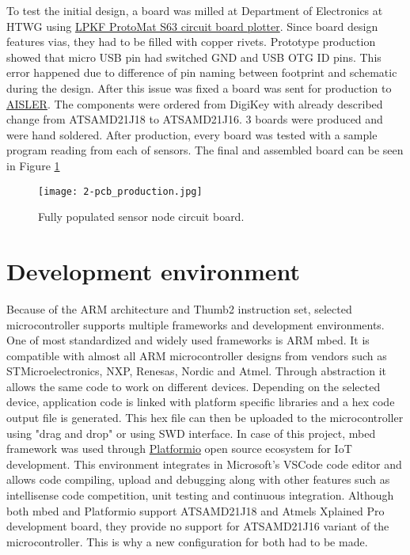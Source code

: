 To test the initial design, a board was milled at Department of Electronics at \ac{HTWG} using \href{http://www.lpkf.com/products/rapid-pcb-prototyping/circuit-board-plotter/protomat-s63.htm}{LPKF ProtoMat S63 circuit board plotter}. Since board design features vias, they had to be filled with copper rivets. Prototype production showed that micro USB pin had switched GND and USB OTG ID pins. This error happened due to difference of pin naming between footprint and schematic during the design. After this issue was fixed a board was sent for production to \href{https://aisler.net/}{AISLER}. The components were ordered from DigiKey with already described change from ATSAMD21J18 to ATSAMD21J16. 3 boards were produced and were hand soldered. After production, every board was tested with a sample program reading from each of sensors. The final and assembled board can be seen in Figure \ref{fig:pcb_production}

\begin{figure}[h]
  \begin{center}
    \texttt{[image: 2-pcb\_production.jpg]}
  \end{center}
  \caption{Fully populated sensor node circuit board.}
  \label{fig:pcb_production}
\end{figure}


\section{Development environment}

Because of the ARM architecture and Thumb2 instruction set, selected microcontroller supports multiple frameworks and development environments. One of most standardized and widely used frameworks is ARM mbed. It is compatible with almost all ARM microcontroller designs from vendors such as STMicroelectronics, NXP, Renesas, Nordic and Atmel\cite{mbed_devices}. Through abstraction it allows the same code to work on different devices. Depending on the selected device, application code is linked with platform specific libraries and a hex code output file is generated. This hex file can then be uploaded to the microcontroller using "drag and drop" or using \ac{SWD} interface\cite{SWD}. In case of this project, mbed framework was used through \href{http://platformio.org}{Platformio} open source ecosystem for \ac{IoT} development. This environment integrates in Microsoft's VSCode code editor and allows code compiling, upload and debugging along with other features such as intellisense code competition, unit testing and continuous integration. Although both mbed and Platformio support ATSAMD21J18 and Atmels Xplained Pro development board, they provide no support for ATSAMD21J16 variant of the microcontroller. This is why a new configuration for both had to be made.

